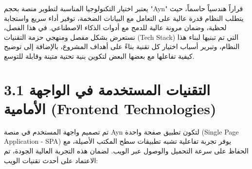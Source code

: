\documentclass[12pt, a4paper]{report}
\begin{document}
\begin{english}
يعتبر اختيار التكنولوجيا المناسبة لتطوير منصة بحجم "Ayn" قراراً هندسياً حاسماً، حيث يتطلب النظام قدرة عالية على التعامل مع البيانات الضخمة، توفير أداء سريع واستجابة لحظية، وضمان مرونة عالية للدمج مع أدوات الذكاء الاصطناعي. في هذا الفصل، نستعرض بشكل مفصل ومنهجي حزمة التقنيات (Tech Stack) التي تم تبنيها لبناء هذا النظام، وتبرير أسباب اختيار كل تقنية بناءً على أهداف المشروع، بالإضافة إلى توضيح كيفية تفاعلها مع بعضها البعض لتكوين بنية تحتية متينة وقابلة للتوسع. \\

\section*{3.1 التقنيات المستخدمة في الواجهة الأمامية (Frontend Technologies)}

تم تصميم واجهة المستخدم في منصة Ayn لتكون تطبيق صفحة واحدة (Single Page Application - SPA) يوفر تجربة تفاعلية تشبه تطبيقات سطح المكتب الأصيلة، مع الحفاظ على سرعة التحميل والوصول عبر الويب. لضمان هذه التجربة العالية الجودة، تم الاعتماد على أحدث تقنيات الويب: \\


\end{english}
\end{document}
